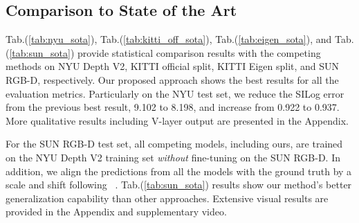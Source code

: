 \documentclass{article} \usepackage{iclr2023_conference, times}
\begin{document}
\subsection{Comparison to State of the Art}
\label{sec:exp_sota}



Tab.(\ref{tab:nyu_sota}), Tab.(\ref{tab:kitti_off_sota}), Tab.(\ref{tab:eigen_sota}), and Tab.(\ref{tab:sun_sota}) provide statistical comparison results with the competing methods on NYU Depth V2, KITTI official split, KITTI Eigen split, and SUN RGB-D, respectively. Our proposed approach shows the best results for all the evaluation metrics. Particularly on the NYU test set, we reduce the SILog error from the previous best result, 9.102 to 8.198, and increase  from 0.922 to 0.937.  More qualitative results including V-layer output are presented in the Appendix.




For the SUN RGB-D test set, all competing models, including ours, are trained on the NYU Depth V2 training set \citep{silberman2012indoor} {\em without} fine-tuning on the SUN RGB-D. In addition, we align the predictions from all the models with the ground truth by a scale and shift following ~\citet{Ranftl2020}. Tab.(\ref{tab:sun_sota}) results show
our method's better generalization capability than other approaches. Extensive visual results are provided in the Appendix and supplementary video.
\end{document}
